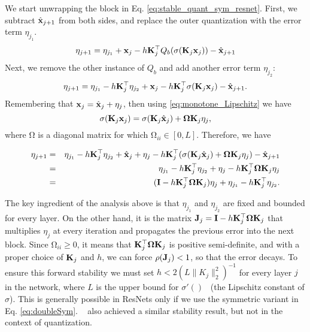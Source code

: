 \documentclass[reqno]{amsart}
\newcommand{\bfx}{ {\bf x}}
\newcommand{\bfI}{{\bf I}}
\newcommand{\bfJ}{{\bf J}}
\newcommand{\bfK}{{\bf K}}
\newcommand{\bfOmega}{{\boldsymbol{\mathrm \Omega}}}
\begin{document}
We start unwrapping the block in Eq. \eqref{eq:stable_quant_sym_resnet}. First, we subtract $\hat\bfx_{j+1}$ from both sides, and replace the outer quantization with the error term $\eta_{j_1}$. 
\begin{equation}
    \eta_{j+1} = \eta_{j_1} + \bfx_j - h \bfK_j^\top Q_b(\sigma(\bfK_j\bfx_j)) - \hat\bfx_{j+1}
\end{equation}
Next, we remove the other instance of $Q_b$ and add another error term $\eta_{j_2}$:
\begin{equation}
    \eta_{j+1} = \eta_{j_1} -h\bfK_j^\top\eta_{j_2} +  \bfx_j - h \bfK_j^\top\sigma(\bfK_j\bfx_j) - \hat\bfx_{j+1}.
\end{equation}
Remembering that $\bfx_j = \hat\bfx_j+\eta_j$, then using \eqref{eq:monotone_Lipschitz} we have
\begin{equation}
    \sigma(\bfK_j\bfx_j) = \sigma(\bfK_j\hat\bfx_j) + \bfOmega\bfK_j\eta_j,
\end{equation}
where $\bfOmega$ is a diagonal matrix for which $\bfOmega_{ii}\in[0,L]$.
Therefore, we have

\begin{eqnarray}
\label{eq:error_prop}
    \eta_{j+1} &=& \eta_{j_1} -h\bfK_j^\top\eta_{j_2} +  \hat\bfx_j+\eta_j - h \bfK_j^\top(\sigma(\bfK_j\hat\bfx_j) + \bfOmega\bfK_j\eta_j) - \hat\bfx_{j+1} \nonumber\\
    & = & \eta_{j_1} -h\bfK_j^\top\eta_{j_2} + \eta_j -h\bfK_j^\top\bfOmega\bfK_j\eta_j  \nonumber \\
    & = & (\bfI -h\bfK_j^\top\bfOmega\bfK_j)\eta_j + \eta_{j_1} -h\bfK_j^\top\eta_{j_2}.
\end{eqnarray}

The key ingredient of the analysis above is that $\eta_{j_1}$ and $\eta_{j_2}$ are fixed and bounded for every layer. On the other hand, it is the matrix 
$\bfJ_j = \bfI -h\bfK_j^\top\bfOmega\bfK_j$
that multiplies $\eta_j$ at every iteration and propagates the previous error into the next block. 
Since $\bfOmega_{ii} \geq 0$, it means that 
$\bfK_j^\top\bfOmega\bfK_j$ is positive semi-definite, and with a proper choice of $\bfK_j$ and $h$, we can force $\rho(\bfJ_j)<1$, so that the error decays. To ensure this forward stability we must set $h < 2(L\|K_j\|_2^2)^{-1}$ for every layer $j$ in the network, where $L$ is the upper bound for $\sigma'()$~\cite{alt2021translating} (the Lipschitz constant of $\sigma$). This is generally possible in ResNets only if we use the symmetric variant in Eq. \eqref{eq:doubleSym}. ~\cite{ruthotto2019deep,zhang2020forward} also achieved a similar stability result, but not in the context of quantization. 
\end{document}
